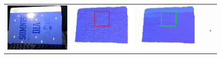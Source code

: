 \begin{figure}[!ht]
\centering
\setlength{\tabcolsep}{0.1em} %
 {\renewcommand{\arraystretch}{2.4}%
\begin{tabular}{c|c c c}
   \includegraphics[height = 0.19\linewidth]{figures/result/robust_folder_rgb.pdf} 
   &
   \includegraphics[height = 0.19\linewidth]{figures/result/rgbd_folder_normal_detail.pdf} &
   \includegraphics[height = 0.19\linewidth]{figures/result/robust_folder_normal_detail.pdf}&
   \includegraphics[width=0.17\textwidth]{figures/result/rgbd_folder_normal_crop.png}
    \\


\end{tabular}}
\end{figure}
